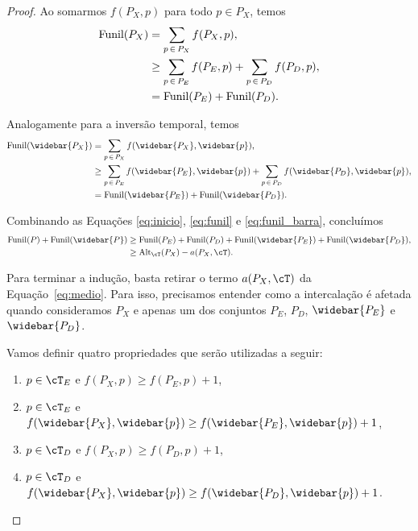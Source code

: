 \begin{proof}
    Ao somarmos $f(P_X,p)$ para todo $p \in P_X$, temos
    \begin{align}
        \text{Funil}(P_X) &= \sum_{p \, \in \, P_X}f(P_X,p), \notag\\
        &\geq \sum_{p \, \in \, P_E}f(P_E,p) + \sum_{p \, \in \, P_D}f(P_D,p), \notag \\
        &= \text{Funil}(P_E) + \text{Funil}(P_D). \label{eq:funil}
    \end{align}

    Analogamente para a inversão temporal, temos
    \begin{align}
        \text{Funil}(\widebar{P_X}) &= \sum_{p \, \in \, P_X}f(\widebar{P_X},\widebar{p}), \notag\\
        &\geq \sum_{p \, \in \, P_E}f(\widebar{P_E},\widebar{p}) + \sum_{p \, \in \, P_D}f(\widebar{P_D},\widebar{p}), \notag \\
        &= \text{Funil}(\widebar{P_E}) + \text{Funil}(\widebar{P_D}). \label{eq:funil_barra}
    \end{align}

    Combinando as Equações \ref{eq:inicio}, \ref{eq:funil} e \ref{eq:funil_barra}, concluímos
    \begin{align}
        \text{Funil}(P) + \text{Funil}(\widebar{P}) &\geq \text{Funil}(P_E) + \text{Funil}(P_D) + \text{Funil}(\widebar{P_E}) + \text{Funil}(\widebar{P_D}), \notag \\
        &\geq \text{Alt}_{\cT}(P_X) - a(P_X,\cT).
        \label{eq:medio}
    \end{align}

    Para terminar a indução, basta retirar o termo $a(P_X,\cT)$ da Equação~\ref{eq:medio}. Para isso, precisamos entender como a intercalação é afetada quando consideramos $P_X$ e apenas um dos conjuntos $P_E$, $P_D$, $\widebar{P_E}$ e $\widebar{P_D}$.

    Vamos definir quatro propriedades que serão utilizadas a seguir:
    \begin{enumerate}[label=(\alph*)]  %
        \item $p \in \cT_E$ e $f(P_X,p) \geq f(P_E,p) + 1$,
        \item $p \in \cT_E$ e $f(\widebar{P_X},\widebar{p}) \geq f(\widebar{P_E},\widebar{p}) + 1$,
        \item $p \in \cT_D$ e $f(P_X,p) \geq f(P_D,p) + 1$,
        \item $p \in \cT_D$ e $f(\widebar{P_X},\widebar{p}) \geq f(\widebar{P_D},\widebar{p}) + 1$.
    \end{enumerate}


\end{proof}
